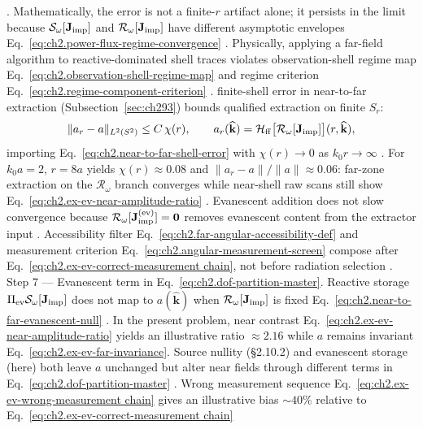 \cite{harrington2001}. Mathematically, the error is not a finite-\(r\) artifact alone;
it persists in the limit because \(\mathcal{S}_\omega[\mathbf{J}_{\mathrm{imp}}]\) and \(\mathcal{R}_\omega[\mathbf{J}_{\mathrm{imp}}]\) have
different asymptotic envelopes Eq.~\eqref{eq:ch2.power-flux-regime-convergence}
\cite{stratton1941}. Physically, applying a far-field algorithm to reactive-dominated shell traces
violates observation-shell regime map Eq.~\eqref{eq:ch2.observation-shell-regime-map} and regime
criterion Eq.~\eqref{eq:ch2.regime-component-criterion} \cite{harrington2001}.
finite-shell error in near-to-far extraction (Subsection~\ref{sec:ch293}) bounds qualified extraction on finite
\(S_r\):
\begin{equation}
\label{eq:ch2.ex-ev-shell-contrast}
\|a_r-a\|_{L^{2}(S^{2})}
\le
C\,\chi(r),
\qquad
a_r(\widehat{\mathbf{k}})
=
\mathcal{H}_{\mathrm{ff}}\big[\mathcal{R}_\omega[\mathbf{J}_{\mathrm{imp}}]\big](r,\widehat{\mathbf{k}}),
\end{equation}
importing Eq.~\eqref{eq:ch2.near-to-far-shell-error} with \(\chi(r)\to 0\) as \(k_0 r\to\infty\)
\cite{stratton1941}. For \(k_0 a=2\), \(r=8a\) yields
\(\chi(r)\approx 0.08\) and \(\|a_r-a\|/\|a\|\approx 0.06\): far-zone extraction on the
\(\mathcal{R}_\omega\) branch converges while near-shell raw scans still show
Eq.~\eqref{eq:ch2.ex-ev-near-amplitude-ratio} \cite{stratton1941}. Evanescent addition does not
slow convergence because \(\mathcal{R}_\omega[\mathbf{J}_{\mathrm{imp}}^{(\mathrm{ev})}]=\mathbf{0}\) removes
evanescent content from the extractor input \cite{harrington2001}. Accessibility filter
Eq.~\eqref{eq:ch2.far-angular-accessibility-def} and measurement criterion
Eq.~\eqref{eq:ch2.angular-measurement-screen} compose after Eq.~\eqref{eq:ch2.ex-ev-correct-measurement chain},
not before radiation selection \cite{stratton1941}.
Step 7 — Evanescent term in Eq.~\eqref{eq:ch2.dof-partition-master}. Reactive storage \(\Pi_{\mathrm{ev}}\mathcal{S}_\omega[\mathbf{J}_{\mathrm{imp}}]\) does not map to
\(a(\widehat{\mathbf{k}})\) when \(\mathcal{R}_\omega[\mathbf{J}_{\mathrm{imp}}]\) is fixed
Eq.~\eqref{eq:ch2.near-to-far-evanescent-null} \cite{stratton1941}. In the present
problem, near contrast Eq.~\eqref{eq:ch2.ex-ev-near-amplitude-ratio} yields an illustrative ratio
\(\approx 2.16\) while \(a\) remains invariant Eq.~\eqref{eq:ch2.ex-ev-far-invariance}. Source
nullity (§2.10.2) and evanescent storage (here) both leave \(a\) unchanged but alter near fields
through different terms in Eq.~\eqref{eq:ch2.dof-partition-master}
\cite{harrington2001}. Wrong measurement sequence Eq.~\eqref{eq:ch2.ex-ev-wrong-measurement chain} gives an
illustrative bias \(\sim 40\%\) relative to Eq.~\eqref{eq:ch2.ex-ev-correct-measurement chain}
